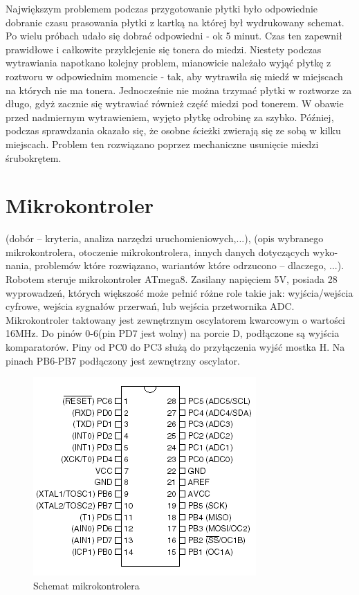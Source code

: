 \documentclass[11pt,a4paper]{article}
\begin{document}
Największym problemem podczas przygotowanie płytki było odpowiednie dobranie czasu prasowania płytki z kartką na której był wydrukowany schemat. 
Po wielu próbach udało się dobrać odpowiedni - ok 5 minut. Czas ten zapewnił prawidłowe i całkowite przyklejenie się tonera do miedzi. 
Niestety podczas wytrawiania napotkano kolejny problem, mianowicie należało wyjąć płytkę z roztworu w odpowiednim momencie - tak, aby wytrawiła się miedź w miejscach na których nie ma tonera. Jednocześnie nie można trzymać płytki w roztworze za długo, gdyż zacznie się wytrawiać również część miedzi pod tonerem. W obawie przed nadmiernym wytrawieniem, wyjęto płytkę odrobinę za szybko. Później, podczas sprawdzania okazało się, że osobne ścieżki zwierają się ze sobą w kilku miejscach. Problem ten rozwiązano poprzez mechaniczne usunięcie miedzi śrubokrętem.

\section{Mikrokontroler}
(dobór – kryteria, analiza narzędzi uruchomieniowych,...), (opis
wybranego mikrokontrolera, otoczenie mikrokontrolera, innych danych dotyczących wyko-
nania, problemów które rozwiązano, wariantów które odrzucono – dlaczego, ...).
  Robotem steruje mikrokontroler ATmega8. Zasilany napięciem 5V, posiada 28 wyprowadzeń, których większość może pełnić różne role takie jak: wyjścia/wejścia cyfrowe, wejścia sygnałów przerwań, lub wejścia przetwornika ADC.
  Mikrokontroler taktowany jest zewnętrznym oscylatorem kwarcowym o wartości 16MHz.
  Do pinów 0-6(pin PD7 jest wolny) na porcie D, podłączone są wyjścia komparatorów. Piny od PC0 do PC3 służą do przyłączenia wyjść mostka H.
  Na pinach PB6-PB7 podłączony jest zewnętrzny oscylator.
   
\begin{figure}[H]
  \includegraphics[scale=1]{atmega8}
  \caption{Schemat mikrokontrolera}
\end{figure}
\end{document}
